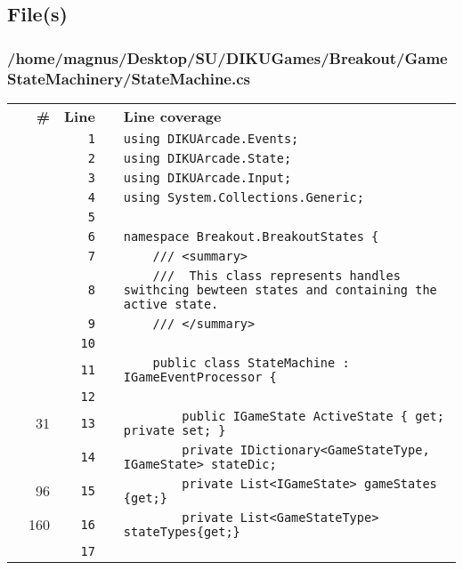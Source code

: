 \documentclass[a4paper,landscape,10pt]{article}
\begin{document}
\subsection{File(s)}
\subsubsection{/home/magnus/Desktop/SU/DIKUGames/Breakout/GameStateMachinery/StateMachine.cs}
\begin{longtable}[l]{lrrll}
\textbf{} & \textbf{\#} & \textbf{Line} & \textbf{} & \textbf{Line coverage}\\
\cellcolor{gray} &  & \verb~1~ & & \verb~using DIKUArcade.Events;~\\
\cellcolor{gray} &  & \verb~2~ & & \verb~using DIKUArcade.State;~\\
\cellcolor{gray} &  & \verb~3~ & & \verb~using DIKUArcade.Input;~\\
\cellcolor{gray} &  & \verb~4~ & & \verb~using System.Collections.Generic;~\\
\cellcolor{gray} &  & \verb~5~ & & \verb~~\\
\cellcolor{gray} &  & \verb~6~ & & \verb~namespace Breakout.BreakoutStates {~\\
\cellcolor{gray} &  & \verb~7~ & & \verb~    /// <summary>~\\
\cellcolor{gray} &  & \verb~8~ & & \verb~    ///  This class represents handles swithcing bewteen states and containing the active state.~\\
\cellcolor{gray} &  & \verb~9~ & & \verb~    /// </summary>~\\
\cellcolor{gray} &  & \verb~10~ & & \verb~~\\
\cellcolor{gray} &  & \verb~11~ & & \verb~    public class StateMachine : IGameEventProcessor {~\\
\cellcolor{gray} &  & \verb~12~ & & \verb~~\\
\cellcolor{green} & 31 & \verb~13~ & & \verb~        public IGameState ActiveState { get; private set; }~\\
\cellcolor{gray} &  & \verb~14~ & & \verb~        private IDictionary<GameStateType, IGameState> stateDic;~\\
\cellcolor{green} & 96 & \verb~15~ & & \verb~        private List<IGameState> gameStates {get;}~\\
\cellcolor{green} & 160 & \verb~16~ & & \verb~        private List<GameStateType> stateTypes{get;}~\\
\cellcolor{gray} &  & \verb~17~ & & \verb~~\\

\end{longtable}
\end{document}
